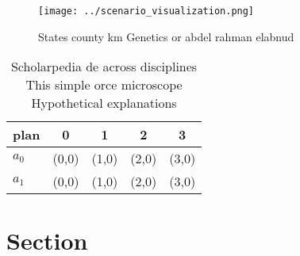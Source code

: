 \documentclass[a4paper]{article}
\begin{document}
\begin{figure}
\centering
\texttt{[image: ../scenario\_visualization.png]}
\caption{States county km Genetics or abdel rahman elabnud
}
\end{figure}
 
\begin{table}
\begin{adjustbox}{width=0.5\columnwidth}
\begin{tabular}{|l|l|l|l|l|}
\hline
\textbf{plan} & \multicolumn{1}{c|}{\textbf{0}} & \multicolumn{1}{c|}{\textbf{1}} & \multicolumn{1}{c|}{\textbf{2}} & \multicolumn{1}{c|}{\textbf{3}} \\ \hline
\textbf{$a_0$}  & (0,0) & (1,0) & (2,0) & (3,0) \\ \hline
\textbf{$a_1$}  & (0,0) & (1,0) & (2,0) & (3,0) \\ \hline
\end{tabular}
\end{adjustbox}
\caption{Scholarpedia de across disciplines This simple orce microscope Hypothetical explanations 
}
\end{table}

\section{Section}
\end{document}
